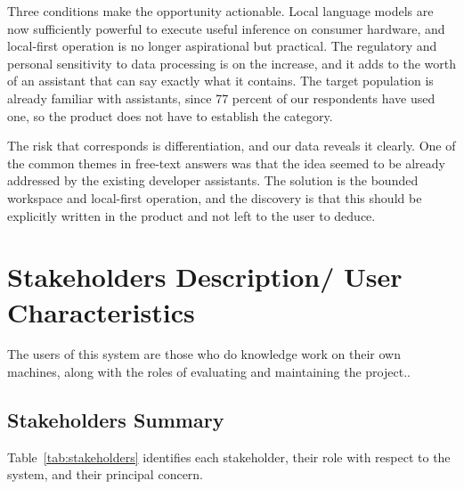 \documentclass{FastFyp}
\begin{document}
Three conditions make the opportunity actionable. Local language models are now sufficiently powerful to execute useful inference on consumer hardware, and local-first operation is no longer aspirational but practical. The regulatory and personal sensitivity to data processing is on the increase, and it adds to the worth of an assistant that can say exactly what it contains. The target population is already familiar with assistants, since 77 percent of our respondents have used one, so the product does not have to establish the category.

The risk that corresponds is differentiation, and our data reveals it clearly. One of the common themes in free-text answers was that the idea seemed to be already addressed by the existing developer assistants. The solution is the bounded workspace and local-first operation, and the discovery is that this should be explicitly written in the product and not left to the user to deduce.

\section{Stakeholders Description/ User Characteristics}
The users of this system are those who do knowledge work on their own machines, along with the roles of evaluating and maintaining the project..

\subsection{Stakeholders Summary}
Table~\ref{tab:stakeholders} identifies each stakeholder, their role with respect to the system, and their principal concern.
\end{document}
